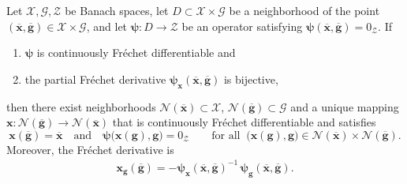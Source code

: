 \documentclass[onefignum,onetabnum]{siamart220329}
\numberwithin{equation}{section}
\newcommand{\bg}{\ensuremath{\mathbf{g}}} %
\newcommand{\bx}{\ensuremath{\mathbf{x}}} %
\newcommand {\bpsi} {\boldsymbol{\psi}}
\newcommand {\cG} {\mathcal{G}}
\newcommand {\cN} {\mathcal{N}}
\newcommand {\cX} {\mathcal{X}}
\newcommand {\cZ} {\mathcal{Z}}
\begin{document}
\begin{theorem} \label{thm:Sensitivity:intro:IFT}
	Let $\cX, \cG, \cZ$ be Banach spaces, let $D \subset \cX \times \cG$ be a neighborhood of the point $(\overline{\bx}, \overline{\bg}) \in \cX \times \cG$, and let 
	$\bpsi : D \rightarrow \cZ$ 
	be an operator satisfying $\bpsi(\overline{\bx}, \overline{\bg}) = 0_\cZ$. If 
	\begin{enumerate}
		\item[(i)] $\bpsi$ is continuously Fr\'echet differentiable and
		
		\item[(ii)] the partial Fr\'echet derivative $\bpsi_\bx(\overline{\bx}, \overline{\bg})$ is bijective,
	\end{enumerate}
	 then there exist neighborhoods $\cN(\overline{\bx}) \subset \cX$, $\cN(\overline{\bg}) \subset \cG$ and a unique mapping $\bx : \cN(\overline{\bg}) \rightarrow \cN(\overline{\bx})$ that is continuously Fr\'echet differentiable and satisfies
	\[
		\bx(\overline{\bg}) = \overline{\bx} \quad \mbox{and} \quad
		\bpsi\big(\bx(\bg), \bg \big) = 0_\cZ \qquad \mbox{for all } \ \big(\bx(\bg), \bg \big) \in \cN(\overline{\bx}) \times \cN(\overline{\bg}).
	\]
	Moreover, the Fr\'echet derivative is
	\begin{align}
		\bx_\bg(\overline{\bg}) = -\bpsi_\bx(\overline{\bx}, \overline{\bg})^{-1} \, \bpsi_\bg(\overline{\bx}, \overline{\bg}). \label{eq:sensitivity:sensitivity_eqn}
	\end{align}
\end{theorem}
\end{document}

